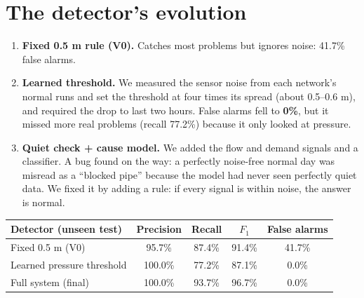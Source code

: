 \documentclass[11pt,a4paper]{article}
\begin{document}
\section{The detector's evolution}
\begin{enumerate}
\item \textbf{Fixed 0.5 m rule (V0).} Catches most problems but ignores noise: 41.7\% false alarms.
\item \textbf{Learned threshold.} We measured the sensor noise from each network's normal runs and set the threshold at four times its spread (about 0.5--0.6 m), and required the drop to last two hours. False alarms fell to \textbf{0\%}, but it missed more real problems (recall 77.2\%) because it only looked at pressure.
\item \textbf{Quiet check + cause model.} We added the flow and demand signals and a classifier. A bug found on the way: a perfectly noise-free normal day was misread as a ``blocked pipe'' because the model had never seen perfectly quiet data. We fixed it by adding a rule: if every signal is within noise, the answer is normal.
\end{enumerate}
\begin{center}\small\begin{tabular}{@{}lcccc@{}}\toprule
Detector (unseen test) & Precision & Recall & $F_1$ & False alarms \\\midrule
Fixed 0.5 m (V0) & 95.7\% & 87.4\% & 91.4\% & 41.7\% \\
Learned pressure threshold & 100.0\% & 77.2\% & 87.1\% & 0.0\% \\
Full system (final) & 100.0\% & 93.7\% & 96.7\% & 0.0\% \\\bottomrule\end{tabular}\end{center}
\end{document}
